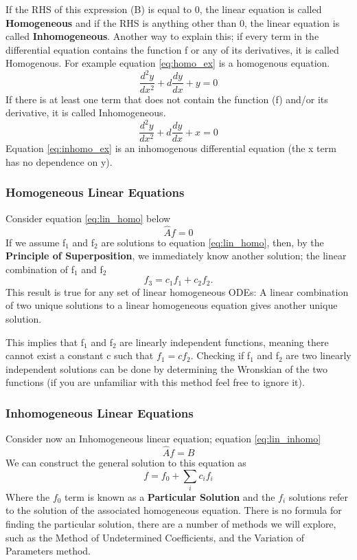 \documentclass{article}
\newcommand{\be}{\begin{equation}}
\newcommand{\ee}{\end{equation}}
\begin{document}
If the RHS of this expression (B) is equal to 0, the linear equation is called \textbf{Homogeneous} and if the RHS is anything other than 0, the linear equation is called \textbf{Inhomogeneous}.
Another way to explain this; if every term in the differential equation contains the function f or any of its derivatives, it is called Homogenous.
For example equation \ref{eq:homo_ex} is a homogenous equation. 
\be \label{eq:homo_ex}
\frac{d^2y}{dx^2} + d\frac{dy}{dx} + y = 0
\ee
If there is at least one term that does not contain the function (f) and/or its derivative, it is called Inhomogeneous.
\be \label{eq:inhomo_ex}
\frac{d^2y}{dx^2} + d\frac{dy}{dx} + x = 0
\ee
Equation \ref{eq:inhomo_ex} is an inhomogenous differential equation (the x term has no dependence on y). 

\subsubsection*{Homogeneous Linear Equations}
Consider equation \ref{eq:lin_homo} below
\be \label{eq:lin_homo}
\hat{A}f = 0
\ee
If we assume f$_1$ and f$_2$ are solutions to equation \ref{eq:lin_homo}, then, by the \textbf{Principle of Superposition}, we immediately know another solution; the linear combination of f$_1$ and f$_2$
\be
f_3 = c_1f_1 + c_2f_2 .
\ee
This result is true for any set of linear homogeneous ODEs: A linear combination of two unique solutions to a linear homogeneous equation gives another unique solution.

This implies that f$_1$ and f$_2$ are linearly independent functions, meaning there cannot exist a constant c such that $f_1 = cf_2$.
Checking if f$_1$ and f$_2$ are two linearly independent solutions can be done by determining the Wronskian of the two functions (if you are unfamiliar with this method feel free to ignore it). 

\subsubsection*{Inhomogeneous Linear Equations}
Consider now an Inhomogeneous linear equation; equation \ref{eq:lin_inhomo}
\be \label{eq:lin_inhomo}
\hat{A}f = B
\ee
We can construct the general solution to this equation as
\be
f = f_0 + \sum_i c_i f_i
\ee
Where the $f_0$ term is known as a \textbf{Particular Solution} and the $f_i$ solutions refer to the solution of the associated homogeneous equation.
There is no formula for finding the particular solution, there are a number of methods we will explore, such as the Method of Undetermined Coefficients, and the Variation of Parameters method.
\end{document}
